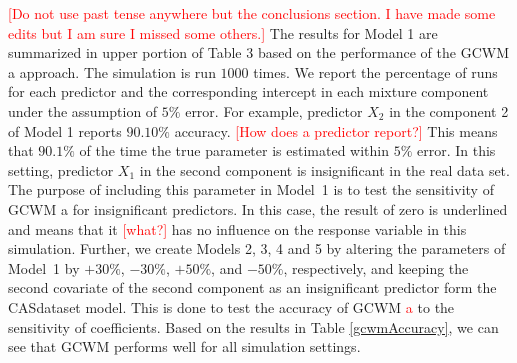 \documentclass[11pt,letterpaper]{article}
\numberwithin{equation}{section}
\numberwithin{equation}{section}
\numberwithin{equation}{section}
\begin{document}
\textcolor{red}{[Do not use past tense anywhere but the conclusions section. I have made some edits but I am sure I missed some others.]} The results for Model 1 are summarized in upper portion of Table 3 based on the performance of the  GCWM a approach. The simulation is run $1000$ times. We report the percentage of runs for each predictor and the corresponding intercept in each mixture component under the assumption of $5\%$ error. For example, predictor $X_2$ in the component 2 of Model 1 reports $90.10\%$ accuracy. \textcolor{red}{[How does a predictor report?]} This means that $90.1\%$ of the time the true parameter is estimated within $5\%$ error. In this setting, predictor $X_1$ in the second component is insignificant in the real data set. The purpose of including this parameter in Model~1 is to test the sensitivity of  GCWM a for insignificant predictors. In this case, the result of zero is underlined and means that it \textcolor{red}{[what?]} has no influence on the response variable in this simulation. Further, we create Models 2, 3, 4 and 5 by altering the parameters of Model~1 by $+30\%$, $-30\%$, $+50\%$, and $-50\%$, respectively, and keeping the second covariate of the second component as an insignificant predictor form the CASdataset model. This is done to test the accuracy of  GCWM \textcolor{red}{a} to the  sensitivity of coefficients. Based on the results in Table \ref{gcwmAccuracy}, we can see that GCWM performs well for all simulation settings.
\end{document}
